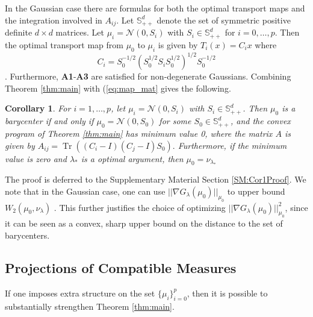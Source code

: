 \documentclass[nohyperref]{article}
\DeclareMathOperator{\Tr}{Tr}
\newtheorem{corollary}{Corollary}
\theoremstyle{definition}
\begin{document}
In the Gaussian case there are formulas for both the optimal transport maps and the integration involved in $A_{ij}$. Let $\mathbb{S}_{++}^d$ denote the set of symmetric positive definite $d \times d$ matrices. Let $\mu_i = \mathcal{N}(0, S_i)$ with $S_i \in \mathbb{S}_{++}^d$ for $i=0,\dots,p$. Then the optimal transport map from $\mu_0$ to $\mu_i$ is given by $T_i(x) = C_ix$ where
\begin{equation} \label{eq:map_mat}
    C_i = S_0^{-1/2}\left ( S_0^{1/2} S_i S_0^{1/2} \right )^{1/2} S_0^{-1/2}
\end{equation}
\cite{agueh2011barycenters}. Furthermore, \textbf{A1}-\textbf{A3} are satisfied for non-degenerate Gaussians. Combining Theorem \ref{thm:main} with (\ref{eq:map_mat} gives the following.
\begin{corollary}
     \label{cor:gaussian}
    For $i=1,\dots,p$, let $\mu_i = \mathcal{N}(0,S_i)$ with $S_i\in\mathbb{S}_{++}^d$. Then $\mu_0$ is a barycenter if and only if $\mu_0 = \mathcal{N}(0,S_0)$ for some $S_0\in\mathbb{S}_{++}^d$, and the convex program of Theorem \ref{thm:main} has minimum value 0, where the matrix $A$ is given by $A_{ij} = \Tr\left ( (C_i - I)(C_j - I)S_0 \right ).$
    Furthermore, if the minimum value is zero and $\lambda_*$ is a optimal argument, then $\mu_0 = \nu_{\lambda_*}$
\end{corollary}

The proof is deferred to the Supplementary Material Section \ref{SM:Cor1Proof}.  We note that in the Gaussian case, one can use $||\nabla G_{\lambda}(\mu_0)||_{\mu_0}$ to upper bound $W_2(\mu_0, \nu_{\lambda})$ \citep{chewi2020gradient, altschuler2021averaging}. This further justifies the choice of optimizing $||\nabla G_{\lambda}(\mu_0)||_{\mu_0}^2$, since it can be seen as a convex, sharp upper bound on the distance to the set of barycenters.

\subsection{Projections of Compatible Measures}

If one imposes extra structure on the set $\{\mu_i\}_{i=0}^p$, then it is possible to substantially strengthen Theorem \ref{thm:main}. 
\end{document}
